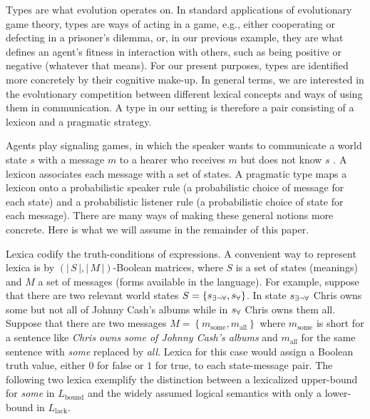 \documentclass[a4paper, 11pt]{article}
\newcommand{\set}[1]{\left\{#1\right\}}
\newcommand{\card}[1]{\left \lvert \, #1 \, \right\rvert}
\newcommand{\States}{\ensuremath{S}\xspace}		%
\newcommand{\state}{\ensuremath{s}\xspace}		%
\newcommand{\mystate}[1]{\ensuremath{\state_{\text{#1}}}\xspace} %
\newcommand{\mylang}[1]{\ensuremath{L_{\text{#1}}}\xspace} %
\newcommand{\Messgs}{\ensuremath{M}\xspace}		%
\newcommand{\messg}{\ensuremath{m}\xspace}		%
\newcommand{\mymessg}[1]{\ensuremath{\messg_{\text{#1}}}\xspace} %
\newcommand{\ssome}{\mystate{\ensuremath{\exists\neg\forall}}}
\newcommand{\sall}{\mystate{\ensuremath{\forall}}}
\newcommand{\msome}{\mymessg{some}}
\newcommand{\mall}{\mymessg{all}}
\newcommand{\Lbound}{\mylang{bound}}
\newcommand{\Llack}{\mylang{lack}}
\begin{document}
Types are what evolution operates on. In standard applications of evolutionary game theory,
types are ways of acting in a game, e.g., either cooperating or defecting in a prisoner's
dilemma, or, in our previous example, they are what defines an agent's fitness in interaction
with others, such as being positive or negative (whatever that means). For our present
purposes, types are identified more concretely by their cognitive make-up. In general terms, we
are interested in the evolutionary competition between different lexical concepts and ways of
using them in communication. A type in our setting is therefore a pair consisting of a lexicon
and a pragmatic strategy.

Agents play signaling games, in which the speaker wants to communicate a world state $s$ with a
message $m$ to a hearer who receives $m$ but does not know $s$
\citep[e.g.][]{lewis:1969,Skyrms2010:Signals}. A lexicon associates each message with a set of
states. A pragmatic type maps a lexicon onto a probabilistic speaker rule (a probabilistic
choice of message for each state) and a probabilistic listener rule (a probabilistic choice of
state for each message). There are many ways of making these general notions more
concrete. Here is what we will assume in the remainder of this paper.

\bigskip
\bigskip
\bigskip

Lexica codify the truth-conditions of expressions. A convenient way to represent lexica is by
$(\card{\States}, \card{\Messgs})$-Boolean matrices, where $\States$ is a set of states
(meanings) and $M$ a set of messages (forms available in the language). For example, suppose
that there are two relevant world states $\States = \set{\ssome, \sall}$. In state $\ssome$
Chris owns some but not all of Johnny Cash's albums while in $\sall$ Chris owns them
all. Suppose that there are two messages $\Messgs = \set{\msome, \mall}$ where $\msome$ is
short for a sentence like \emph{Chris owns some of Johnny Cash's albums} and $\mall$ for the
same sentence with \emph{some} replaced by \emph{all}.  
Lexica for this case would assign a Boolean truth value, either $0$ for false or $1$ for true, to each state-message pair. The following two lexica exemplify the distinction
between a lexicalized upper-bound for \emph{some} in $\Lbound$ and the widely assumed logical
semantics with only a lower-bound in $\Llack$.
\end{document}
